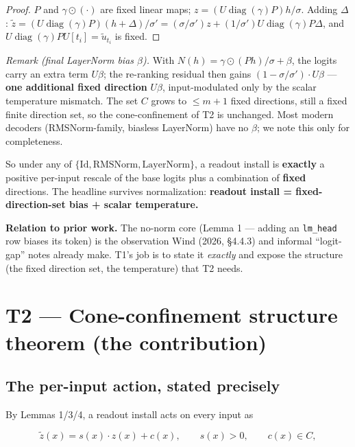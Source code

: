 \documentclass[11pt]{article}
\theoremstyle{plain}
\theoremstyle{definition}
\begin{document}
\begin{proof}
$P$ and $\gamma\odot(\cdot)$ are fixed linear maps; $z = (U \operatorname{diag}(\gamma) P) h / \sigma$. Adding $\Delta$: $\tilde z = (U \operatorname{diag}(\gamma) P)(h+\Delta)/\sigma' = (\sigma/\sigma')z + (1/\sigma') U \operatorname{diag}(\gamma) P \Delta$, and $U \operatorname{diag}(\gamma) P U[t_i] = \tilde u_{t_i}$ is fixed.
\end{proof}

\emph{Remark (final LayerNorm bias $\beta$).} With $N(h) = \gamma \odot (Ph)/\sigma + \beta$, the logits carry an extra term $U\beta$; the re-ranking residual then gains $(1 - \sigma/\sigma')\cdot U\beta$ — \textbf{one additional fixed direction} $U\beta$, input-modulated only by the scalar temperature mismatch. The set $C$ grows to $\le m+1$ fixed directions, still a fixed finite direction set, so the cone-confinement of T2 is unchanged. Most modern decoders (RMSNorm-family, biasless LayerNorm) have no $\beta$; we note this only for completeness.

So under any of $\{\mathrm{Id}, \mathrm{RMSNorm}, \mathrm{LayerNorm}\}$, a readout install is \textbf{exactly} a positive per-input rescale of the base logits plus a combination of \textbf{fixed} directions. The headline survives normalization: \textbf{readout install = fixed-direction-set bias + scalar temperature.}

\textbf{Relation to prior work.} The no-norm core (Lemma 1 — adding an \texttt{lm\_head} row biases its token) is the observation Wind (2026, \S4.4.3) and informal ``logit-gap'' notes already make. T1's job is to state it \emph{exactly} and expose the structure (the fixed direction set, the temperature) that T2 needs.

\section{T2 --- Cone-confinement structure theorem (the contribution)}

\subsection{The per-input action, stated precisely}

By Lemmas 1/3/4, a readout install acts on every input as

\begin{equation}\tag{3}
\tilde z(x) = s(x)\cdot z(x) + c(x), \qquad s(x) > 0, \qquad c(x) \in C,
\end{equation}
\end{document}
